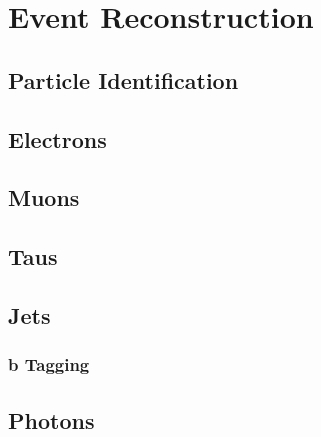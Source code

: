 \chapter{Event Reconstruction}
\section{Particle Identification}
\section{Electrons}
\section{Muons}
\section{Taus}
\section{Jets}
\subsection{b Tagging}\label{ssec:btag}
\section{Photons}



